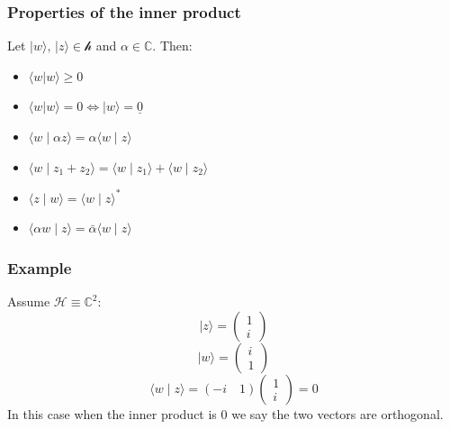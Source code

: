 \documentclass[12pt]{article}
\begin{document}
\subsubsection*{Properties of the inner product}
Let \(|w\rangle,\, |z\rangle \in \mathcal{h}\) and \(\alpha\in \mathbb{C}\). Then:
\begin{itemize}
    \item \(\langle w| w\rangle \geq 0\)
    \item \(\langle w|w\rangle=0\iff |w\rangle =\underline{0}\)
    \item \(\langle w\mid \alpha z\rangle =\alpha\langle w\mid z\rangle\)
    \item \(\langle w\mid z_1+z_2\rangle=\langle w\mid z_1\rangle +\langle w\mid z_2\rangle\)
    \item \(\langle z\mid w\rangle = \langle w\mid z\rangle ^*\)
    \item \(\langle \alpha w\mid z\rangle =\bar{\alpha}\langle w \mid z\rangle\)
\end{itemize}
\subsubsection*{Example}
Assume \(\mathcal{H}\equiv \mathbb{C}^2\):
\[|z\rangle =\begin{pmatrix}
    1 \\ i
\end{pmatrix}\]
\[|w\rangle =\begin{pmatrix}
    i \\ 1
\end{pmatrix}\]
\[\langle w\mid z\rangle =(-i\quad 1)\begin{pmatrix}
    1 \\ i
\end{pmatrix}=0\]
In this case when the inner product is 0 we say the two vectors are orthogonal.
\end{document}
